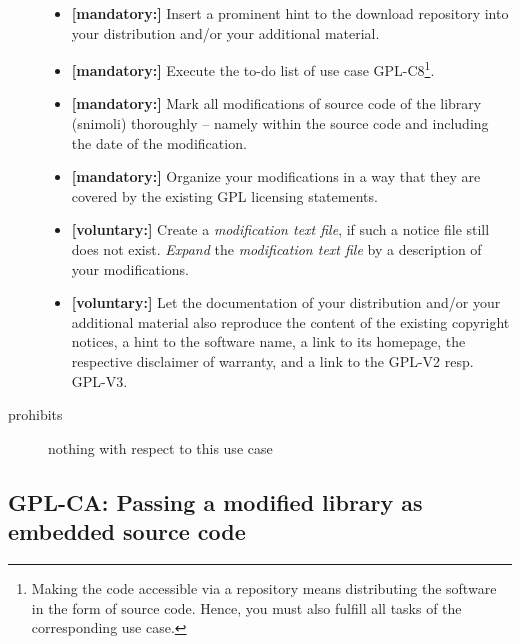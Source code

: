 \begin{description}
\begin{itemize}
  \item \textbf{[mandatory:]} Insert a prominent hint to the download repository
  into your distribution and/or your additional material.
  
  \item \textbf{[mandatory:]} Execute the to-do list of use case GPL-C8\footnote{
  Making the code accessible via a repository means distributing the software in
  the form of source code. Hence, you must also fulfill all tasks of the
  corresponding use case.}.

  \item \textbf{[mandatory:]} Mark all modifications of source code of the
  library (snimoli) thoroughly -- namely within the source code and including
  the date of the modification.

  \item \textbf{[mandatory:]} Organize your modifications in a way that they are
  covered by the existing GPL licensing statements.
    
  \item \textbf{[voluntary:]} Create a \emph{modification text file}, if such a
  notice file still does not exist. \emph{Expand} the \emph{modification text
  file} by a description of your modifications.

  \item \textbf{[voluntary:]} Let the documentation of your distribution and/or
  your additional material also reproduce the content of the existing
  copyright notices, a hint to the software name, a link to its homepage,
  the respective disclaimer of warranty, and a link to the GPL-V2 resp.
  GPL-V3.
  
\end{itemize}

\item[prohibits] nothing with respect to this use case
\end{description}

\subsection{GPL-CA: Passing a modified library as embedded source code}
\label{OSUC-10S-GPL}

